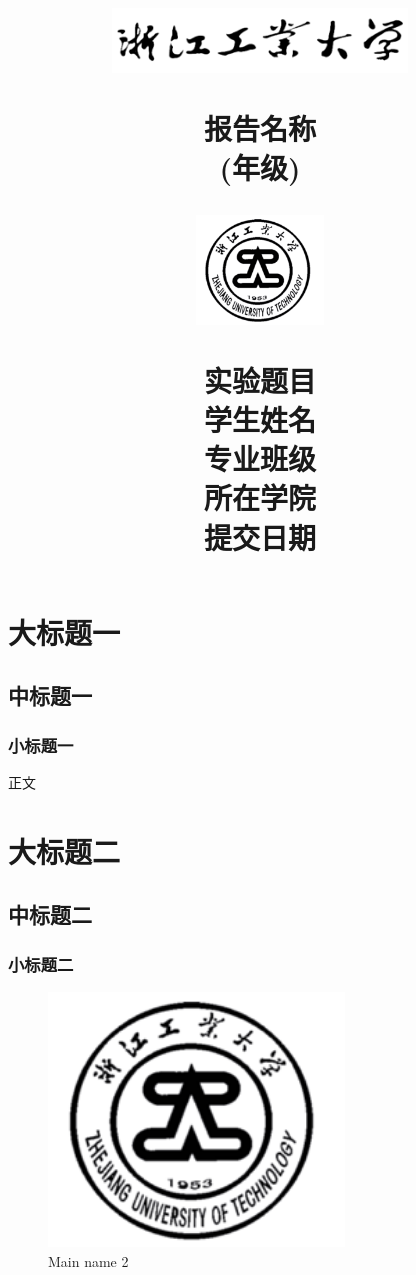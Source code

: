 \documentclass[a4paper,12pt]{ctexart}
\title{
  \begin{figure}[H]
    \centering
    \includegraphics[width=0.7\textwidth]{./img/校名.png}
  \end{figure} 
  \huge \textbf{报告名称} \\ 
  \large \textbf{(年级)}
  \begin{figure}[H]
    \centering
    \includegraphics[width=0.3\textwidth]{./img/校徽.png}
  \end{figure}
  \large 实验题目\hspace{0.7cm}\underline{\makebox[5.5cm]{实验1}} \\
  \large 学生姓名\hspace{0.7cm}\underline{\makebox[5.5cm]{派大星}} \\
  \large 专业班级\hspace{0.7cm}\underline{\makebox[5.5cm]{软件工程 2103}} \\
  \large 所在学院\hspace{0.7cm}\underline{\makebox[5.5cm]{计算机科学与技术学院}} \\
  \large 提交日期\hspace{0.7cm}\underline{\makebox[5.5cm]{2023年3月9日}} \\
}
\author{}
\date{}
\begin{document}
\maketitle
\newpage

\tableofcontents
\newpage

\listoffigures
\listoftables
\newpage

\section{大标题一}

\subsection{中标题一}

\subsubsection{小标题一}

正文

\section{大标题二}

\subsection{中标题二}

\subsubsection{小标题二}

\begin{figure}[H] %
  \centering %
  \includegraphics[width=0.7\textwidth]{./img/校徽.png} %
  \caption{Main name 2} %
  \label{Fig.main2} %
\end{figure}
\end{document}
